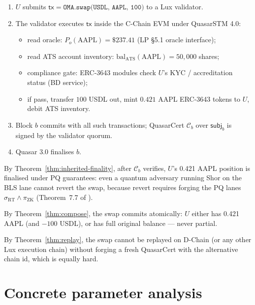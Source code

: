 \documentclass[11pt]{article}
\newcommand{\bal}{\mathrm{bal}}
\begin{document}
\begin{enumerate}[nosep]
  \item $U$ submits $\mathsf{tx} = \texttt{OMA.swap(USDL, AAPL, 100)}$
        to a Lux validator.
  \item The validator executes $\mathsf{tx}$ inside the C-Chain EVM
        under QuasarSTM 4.0:
        \begin{itemize}[nosep]
          \item read oracle: $P_o(\text{AAPL}) = \$237.41$
                (LP \S5.1 oracle interface);
          \item read ATS account inventory:
                $\bal_{\mathrm{ATS}}(\text{AAPL}) = 50{,}000$ shares;
          \item compliance gate: ERC-3643 modules check
                $U$'s KYC / accreditation status (BD service);
          \item if pass, transfer $100$ USDL out, mint
                $0.421$ AAPL ERC-3643 tokens to $U$, debit ATS
                inventory.
        \end{itemize}
  \item Block $b$ commits with all such transactions; QuasarCert
        $\mathcal{C}_b$ over $\mathsf{subj}_b$ is signed by the
        validator quorum.
  \item Quasar 3.0 finalises $b$.
\end{enumerate}

By Theorem~\ref{thm:inherited-finality}, after $\mathcal{C}_b$
verifies, $U$'s 0.421 AAPL position is finalised under PQ
guarantees: even a quantum adversary running Shor on the BLS lane
cannot revert the swap, because revert requires forging the PQ lanes
$\sigma_{\mathrm{RT}} \land \pi_{\mathrm{ZK}}$
(Theorem~7.7 of \cite{quasar-cert}).

By Theorem~\ref{thm:compose}, the swap commits atomically: $U$
either has 0.421 AAPL (and $-100$ USDL), or has full original
balance --- never partial.

By Theorem~\ref{thm:replay}, the swap cannot be replayed on
D-Chain (or any other Lux execution chain) without forging a fresh
QuasarCert with the alternative chain id, which is equally hard.

\section{Concrete parameter analysis}
\label{sec:params}
\end{document}
